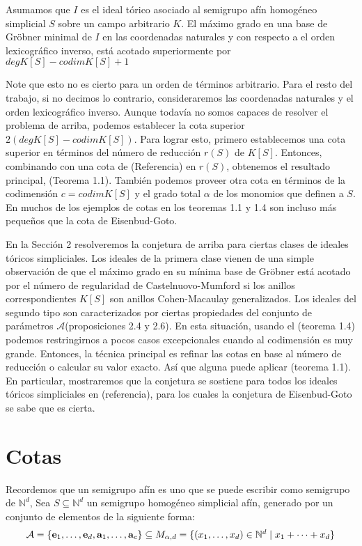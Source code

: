 \begin{theorem}
Asumamos que $I$ es el ideal tórico asociado al semigrupo afín homogéneo simplicial $S$ sobre un campo arbitrario $K$. El máximo grado en una base de Gröbner minimal de $I$ en las coordenadas naturales y con respecto a el orden lexicográfico inverso, está acotado superiormente por $degK[S] - codimK[S] + 1$

\end{theorem} 

Note que esto no es cierto para un orden de términos arbitrario. Para el resto del trabajo, si no decimos lo contrario, consideraremos las coordenadas naturales y el orden lexicográfico inverso. Aunque todavía no somos capaces de resolver el problema de arriba, podemos establecer la cota superior $2(degK[S] - codimK[S])$. Para lograr esto, primero establecemos una cota superior en términos del número de reducción $r(S)$ de $K[S]$. Entonces, combinando con una cota de (Referencia) en $r(S)$, obtenemos el resultado principal, (Teorema 1.1). También podemos proveer otra cota en términos de la codimensión $c = codim K[S]$ y el grado total $\alpha$ de los monomios que definen a $S$. En muchos de los ejemplos de cotas en los teoremas 1.1 y 1.4 son incluso más pequeños que la cota de Eisenbud-Goto.

En la Sección 2 resolveremos la conjetura de arriba para ciertas clases de ideales tóricos simpliciales. Los ideales de la primera clase vienen de una simple observación de que el máximo grado en su mínima base de Gröbner está acotado por el número de regularidad de Castelnuovo-Mumford si los anillos correspondientes $K[S]$ son anillos Cohen-Macaulay generalizados. Los ideales del segundo tipo son caracterizados por ciertas propiedades del conjunto de parámetros $\mathcal{A}$(proposiciones 2.4 y 2.6). En esta situación, usando el (teorema 1.4) podemos restringirnos a pocos casos excepcionales cuando al codimensión es muy grande. Entonces, la técnica principal es refinar las cotas en base al número de reducción o calcular su valor exacto. Así que alguna puede aplicar (teorema 1.1). En particular, mostraremos que la conjetura se sostiene para todos los ideales tóricos simpliciales en (referencia), para los cuales la conjetura de Eisenbud-Goto se sabe que es cierta.

\section{Cotas}

Recordemos que un semigrupo afín es uno que se puede escribir como semigrupo de $\mathbb{N}^d$, 
Sea $S \subseteq \mathbb{N}^{d}$ un semigrupo homogéneo simplicial afín, generado por un conjunto de elementos de la siguiente forma:
\begin{multline*}
$$  \mathcal{A} = \{\textbf{e}_1, \dots, \textbf{e}_d, \textbf{a}_1,\dots,\textbf{a}_c\} \subseteq M_{\alpha, d} = \{(x_1,\dots, x_d)\in \mathbb{N}^d \mid x_1 + \cdots + x_d\}$$
\end{multline*}

